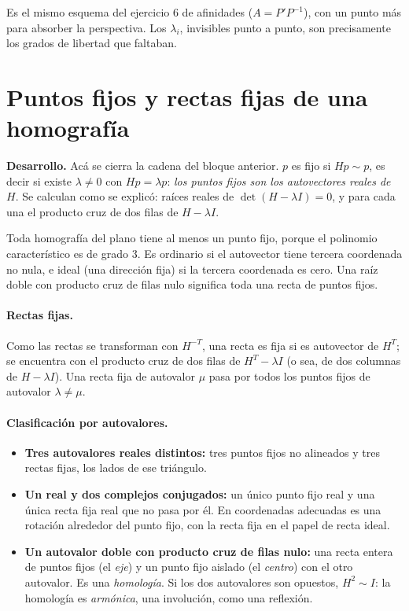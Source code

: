 Es el mismo esquema del ejercicio 6 de afinidades (\(A=P'P^{-1}\)), con un punto más para
absorber la perspectiva. Los \(\lambda_i\), invisibles punto a punto, son precisamente los
grados de libertad que faltaban.

\section{Puntos fijos y rectas fijas de una homografía}\label{sec:homografia-fijos}

\textbf{Desarrollo.} Acá se cierra la cadena del bloque anterior. \(p\) es fijo si
\(Hp\sim p\), es decir si existe \(\lambda\neq0\) con \(Hp=\lambda p\): \emph{los puntos
fijos son los autovectores reales de \(H\)}. Se calculan como se explicó: raíces reales de
\(\det(H-\lambda I)=0\), y para cada una el producto cruz de dos filas de \(H-\lambda I\).

\begin{resultado}
Toda homografía del plano tiene al menos un punto fijo, porque el polinomio característico
es de grado \(3\). Es ordinario si el autovector tiene tercera coordenada no nula, e ideal
(una dirección fija) si la tercera coordenada es cero. Una raíz doble con producto cruz de
filas nulo significa toda una recta de puntos fijos.
\end{resultado}

\paragraph{Rectas fijas.} Como las rectas se transforman con \(H^{-T}\), una recta es fija
si es autovector de \(H^{T}\); se encuentra con el producto cruz de dos filas de
\(H^{T}-\lambda I\) (o sea, de dos columnas de \(H-\lambda I\)). Una recta fija de autovalor
\(\mu\) pasa por todos los puntos fijos de autovalor \(\lambda\neq\mu\).

\paragraph{Clasificación por autovalores.}
\begin{itemize}
  \item \textbf{Tres autovalores reales distintos:} tres puntos fijos no alineados y tres
  rectas fijas, los lados de ese triángulo.
  \item \textbf{Un real y dos complejos conjugados:} un único punto fijo real y una única
  recta fija real que no pasa por él. En coordenadas adecuadas es una rotación alrededor del
  punto fijo, con la recta fija en el papel de recta ideal.
  \item \textbf{Un autovalor doble con producto cruz de filas nulo:} una recta entera de
  puntos fijos (el \emph{eje}) y un punto fijo aislado (el \emph{centro}) con el otro
  autovalor. Es una \emph{homología}. Si los dos autovalores son opuestos, \(H^2\sim I\): la
  homología es \emph{armónica}, una involución, como una reflexión.
\end{itemize}

